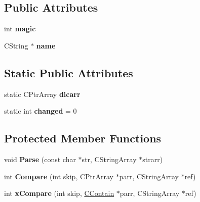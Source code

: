 \subsection*{Public Attributes}
\begin{DoxyCompactItemize}
\item 
\hypertarget{class_c_dic_rec_aeae06bfba47127a070f51b4b8fa748b2}{int {\bfseries magic}}\label{class_c_dic_rec_aeae06bfba47127a070f51b4b8fa748b2}

\item 
\hypertarget{class_c_dic_rec_a8086aa0b7baef39634ebd98b9574e235}{C\-String $\ast$ {\bfseries name}}\label{class_c_dic_rec_a8086aa0b7baef39634ebd98b9574e235}

\end{DoxyCompactItemize}
\subsection*{Static Public Attributes}
\begin{DoxyCompactItemize}
\item 
\hypertarget{class_c_dic_rec_afe319ff39a296b583eee8b6a808ef6dd}{static C\-Ptr\-Array {\bfseries dicarr}}\label{class_c_dic_rec_afe319ff39a296b583eee8b6a808ef6dd}

\item 
\hypertarget{class_c_dic_rec_a3bad7bb3db3a87fe2c35221709de9b35}{static int {\bfseries changed} = 0}\label{class_c_dic_rec_a3bad7bb3db3a87fe2c35221709de9b35}

\end{DoxyCompactItemize}
\subsection*{Protected Member Functions}
\begin{DoxyCompactItemize}
\item 
\hypertarget{class_c_dic_rec_a2db98df6627c81be57c8279fa202d9ac}{void {\bfseries Parse} (const char $\ast$str, C\-String\-Array $\ast$strarr)}\label{class_c_dic_rec_a2db98df6627c81be57c8279fa202d9ac}

\item 
\hypertarget{class_c_dic_rec_a2c9bfe94defaef9f9a115c066ccefddf}{int {\bfseries Compare} (int skip, C\-Ptr\-Array $\ast$parr, C\-String\-Array $\ast$ref)}\label{class_c_dic_rec_a2c9bfe94defaef9f9a115c066ccefddf}

\item 
\hypertarget{class_c_dic_rec_af172e8afe7f2d35b34cc98dff05231a4}{int {\bfseries x\-Compare} (int skip, \hyperlink{class_c_contain}{C\-Contain} $\ast$parr, C\-String\-Array $\ast$ref)}\label{class_c_dic_rec_af172e8afe7f2d35b34cc98dff05231a4}

\end{DoxyCompactItemize}
